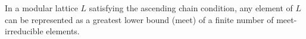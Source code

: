In a modular lattice $L$ satisfying the ascending chain condition, any element of $L$ can be represented as a greatest lower bound (meet) of a finite number of meet-irreducible elements.
